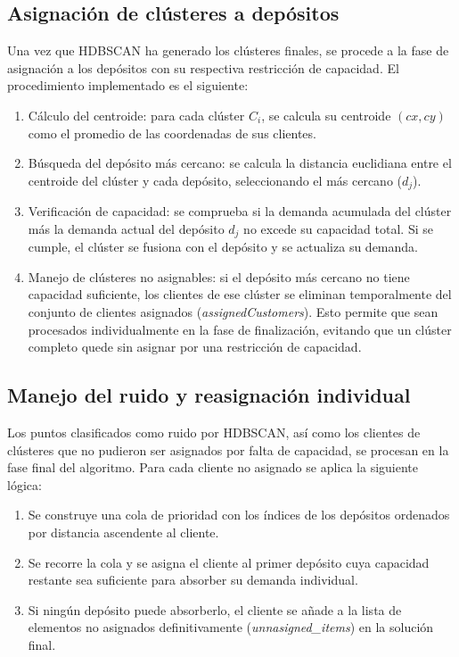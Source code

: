 \subsection{Asignación de clústeres a depósitos}

Una vez que HDBSCAN ha generado los clústeres finales, se procede a la fase de asignación a los depósitos con su respectiva restricción de capacidad. El procedimiento implementado es el siguiente:

\begin{enumerate}
    \item Cálculo del centroide: para cada clúster \(C_i\), se calcula su centroide \((cx, cy)\) como el promedio de las coordenadas de sus clientes.
    \item Búsqueda del depósito más cercano: se calcula la distancia euclidiana entre el centroide del clúster y cada depósito, seleccionando el más cercano (\(d_j\)).
    \item Verificación de capacidad: se comprueba si la demanda acumulada del clúster más la demanda actual del depósito \(d_j\) no excede su capacidad total. Si se cumple, el clúster se fusiona con el depósito y se actualiza su demanda.
    \item Manejo de clústeres no asignables: si el depósito más cercano no tiene capacidad suficiente, los clientes de ese clúster se eliminan temporalmente del conjunto de clientes asignados (\textit{assignedCustomers}). Esto permite que sean procesados individualmente en la fase de finalización, evitando que un clúster completo quede sin asignar por una restricción de capacidad.
\end{enumerate}

\subsection{Manejo del ruido y reasignación individual}

Los puntos clasificados como ruido por HDBSCAN, así como los clientes de clústeres que no pudieron ser asignados por falta de capacidad, se procesan en la fase final del algoritmo. Para cada cliente no asignado se aplica la siguiente lógica:

\begin{enumerate}
    \item Se construye una cola de prioridad con los índices de los depósitos ordenados por distancia ascendente al cliente.
    \item Se recorre la cola y se asigna el cliente al primer depósito cuya capacidad restante sea suficiente para absorber su demanda individual.
    \item Si ningún depósito puede absorberlo, el cliente se añade a la lista de elementos no asignados definitivamente (\textit{unnasigned\_items}) en la solución final.
\end{enumerate}

